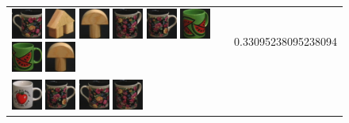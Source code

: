 \begin{figure}[tbp]
\begin{center}
\begin{tabular}{m{11cm} | m{3cm} |}
\includegraphics[width=1cm]{coil/beeld-61.eps}
\includegraphics[width=1cm]{coil/beeld-45.eps}
\includegraphics[width=1cm]{coil/beeld-0.eps}
\includegraphics[width=1cm]{coil/beeld-63.eps}
\includegraphics[width=1cm]{coil/beeld-60.eps}
\includegraphics[width=1cm]{coil/beeld-33.eps}
\includegraphics[width=1cm]{coil/beeld-30.eps}
\includegraphics[width=1cm]{coil/beeld-1.eps}
& {\scriptsize 0.33095238095238094}
\\
\includegraphics[width=1cm]{coil/beeld-36.eps}
\includegraphics[width=1cm]{coil/beeld-60.eps}
\includegraphics[width=1cm]{coil/beeld-61.eps}
\includegraphics[width=1cm]{coil/beeld-63.eps}

\end{tabular}
\end{center}
\end{figure}
